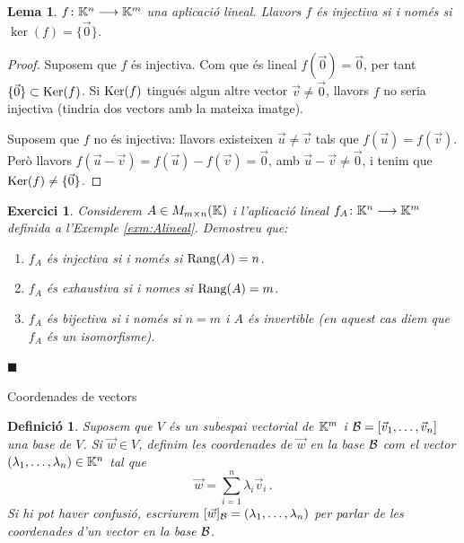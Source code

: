 \documentclass[
  11pt,
]{book}
\makeatletter
\numberwithin{dummy}{section}
\theoremstyle{maincolornumbox}
\newtheorem{exerciseT}{Exercici}[chapter]
\theoremstyle{blacknumex}
\theoremstyle{blacknumbox}
\newtheorem{definitionT}{Definició}[chapter]
\theoremstyle{maincolornum}
\newtheorem{lemmaT}{Lema}[chapter]
\newenvironment{lemma}{\begin{pBox}\begin{lemmaT}}{\end{lemmaT}\end{pBox}}
\newenvironment{exercise}{\begin{eBox}\begin{exerciseT}}{\hfill{\color{maincolor}\tiny\ensuremath{\blacksquare}}\end{exerciseT}\end{eBox}}
\newenvironment{definition}{\begin{dBox}\begin{definitionT}}{\end{definitionT}\end{dBox}}
\renewcommand{\section}{\@startsection{section}{1}{\z@}
{-4ex \@plus -1ex \@minus -.4ex}
{1ex \@plus.2ex }
{\normalfont\large\sffamily\bfseries}}
\newlength\esp
\makeatother
\begin{document}
\begin{lemma}
\(f \colon \mathbb{K}^n \longrightarrow \mathbb{K}^m\) una aplicació lineal. Llavors \(f\) és injectiva
si i només si \(\ker(f)=\{\vec 0\}\).
\end{lemma}

\begin{proof}
Suposem que \(f\) és injectiva. Com que és lineal
\(f(\vec 0)=\vec 0\), per tant \(\{\vec 0\} \subset \operatorname{Ker}(f)\). Si \(\operatorname{Ker}(f)\)
tingués algun altre vector \(\vec v \neq \vec 0\), llavors \(f\) no seria
injectiva (tindria dos vectors amb la mateixa imatge).

Suposem que \(f\) no és injectiva: llavors existeixen \(\vec u \neq \vec v\)
tals que \(f(\vec u)=f(\vec v)\). Però llavors
\(f(\vec u- \vec v)=f(\vec u)-f(\vec v)=\vec 0\), amb
\(\vec u-\vec v\neq \vec 0\), i tenim que \(\operatorname{Ker}(f)\neq \{\vec 0\}\).
\end{proof}

\begin{exercise}

Considerem \(A \in M_{m\times n}(\mathbb{K})\) i l'aplicació lineal
\(f_A\colon \mathbb{K}^n\longrightarrow \mathbb{K}^m\) definida a l'Exemple
\ref{exm:Alineal}. Demostreu que:

\begin{enumerate}
\def\labelenumi{(\alph{enumi})}
\item
  \(f_A\) és injectiva si i només si \(\operatorname{Rang}(A)=n\).
\item
  \(f_A\) és exhaustiva si i nomes si \(\operatorname{Rang}(A)=m\).
\item
  \(f_A\) és bijectiva si i només si \(n=m\) i \(A\) és invertible (en
  aquest cas diem que \(f_A\) és un isomorfisme).
\end{enumerate}

\end{exercise}

\hypertarget{coordenades-de-vectors}{%
\section{Coordenades de vectors}\label{coordenades-de-vectors}}

\begin{definition}
Suposem que \(V\) és un subespai vectorial de \(\mathbb{K}^m\) i
\(\mathcal{B} =[\vec v_1, \dots, \vec v_n]\) una base de \(V\). Si \(\vec w \in V\),
definim les \emph{coordenades de \(\vec w\) en la base \(\mathcal{B}\)} com el vector
\((\lambda_1,\dots,\lambda_n)\in\mathbb{K}^n\) tal que
\[\vec w = \sum_{i=1}^n \lambda_i \vec v_i \,.\] Si hi pot haver
confusió, escriurem \([\vec w]_{\mathcal{B}}=(\lambda_1,\dots,\lambda_n)\) per
parlar de les coordenades d'un vector en la base \(\mathcal{B}\).
\end{definition}
\end{document}
